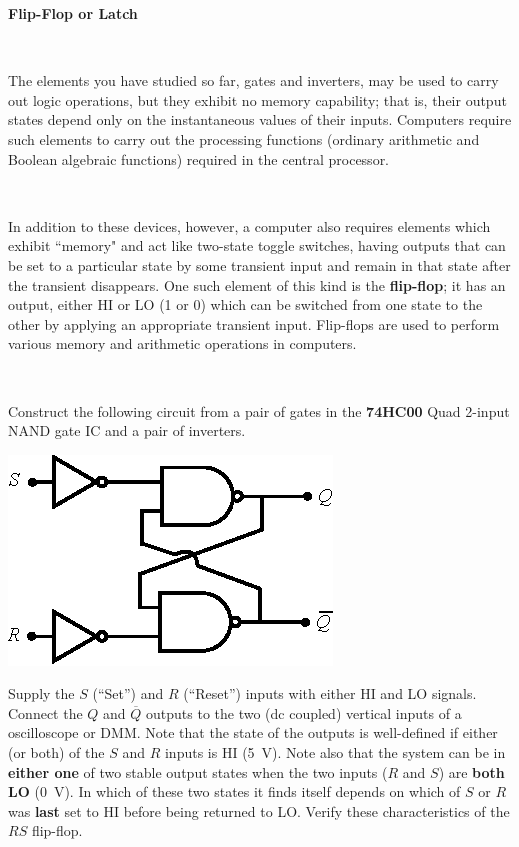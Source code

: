 \documentclass[12pt,oneside,openany,letterpaper]{article}
\begin{document}
\clearpage
{\large{\bf Flip-Flop or Latch}}

~

\noindent The elements you have studied so far, gates and inverters, may be used to carry out logic
operations, but they exhibit no memory capability; that is, their output states depend only
on the instantaneous values of their inputs. Computers require such elements to carry out
the processing functions (ordinary arithmetic and Boolean algebraic functions) required in
the central processor.

~

\noindent In addition to these devices, however, a computer also requires elements which exhibit
``memory" and act like two-state toggle switches, having outputs that can be set to a
particular state by some transient input and remain in that state after the transient
disappears. One such element of this kind is the {\bf flip-flop}; it has an output, either HI or
LO (1 or 0) which can be switched from one state to the other by applying an appropriate
transient input. Flip-flops are used to perform various memory and arithmetic operations
in computers.

~

\noindent Construct the following circuit from a pair of gates in the {\bf 74HC00} Quad 2-input NAND
gate IC and a pair of inverters.
\begin{center}
\includegraphics[width=8 cm]{flipflop.eps}
\end{center}

\noindent Supply the $S$ (``Set'') and $R$ (``Reset'') inputs with either HI and LO signals. Connect the
$Q$ and $\overline{Q}$ outputs to the two (dc coupled) vertical inputs of a oscilloscope or DMM. Note
that the state of the outputs is well-defined if either (or both) of the $S$ and $R$ inputs is HI
(5~V). Note also that the system can be in {\bf either one} of two stable output states when the
two inputs ($R$ and $S$) are {\bf both LO} (0~V). In which of these two states it finds itself
depends on which of $S$ or $R$ was {\bf last} set to HI before being returned to LO. Verify these
characteristics of the $RS$ flip-flop.
\end{document}

